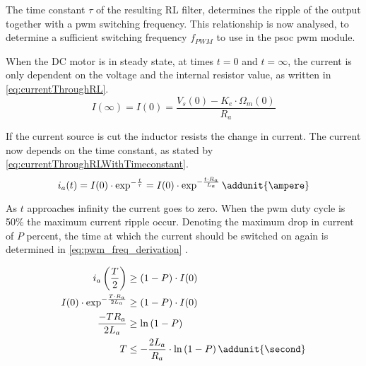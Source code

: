 The time constant $\tau$ of the resulting RL filter, determines the ripple of the output together with a \gls{pwm} switching frequency. This relationship is now analysed, to determine a sufficient switching frequency $f_{PWM}$ to use in the \gls{psoc} \gls{pwm} module.

When the DC motor is in steady state, at times $t = 0$ and $t = \infty$, the current is only dependent on the voltage and the internal resistor value, as written in \autoref{eq:currentThroughRL}. 
\begin{equation} \label{eq:currentThroughRL}
I(\infty) = I(0) = \frac{V_s(0) - K_e \cdot \Omega_m(0)}{R_a}
\end{equation}

If the current source is cut the inductor resists the change in current. The current now depends on the time constant, as stated by \autoref{eq:currentThroughRLWithTimeconstant}. 
\begin{equation}\label{eq:currentThroughRLWithTimeconstant}
	i_a (t) = I(0) \cdot \exp^{-\frac{t}{\tau}}  = I(0) \cdot \exp^{-\frac{t \cdot R_a}{L_a}} \addunit{\ampere}
\end{equation}

As $t$ approaches infinity the current goes to zero. When the \gls{pwm} duty cycle is 50\% the maximum current ripple occur. Denoting the maximum drop in current of $P$ percent, the time at which the current should be switched on again is determined in \autoref{eq:pwm_freq_derivation} \citep{web:PWMfreq}.

\begin{align} 
\nonumber	i_a\left(\frac{T}{2}\right) &\geq \left(1 - P\right) \cdot  I(0) \\ \nonumber
	I(0)\cdot \exp^{-\frac{T \cdot R_a}{2 L_a}} &\geq \left(1 - P\right) \cdot I(0) \\ \nonumber
	\frac{-T R_a}{2 L_a} &\geq \ln \left(1 - P\right)  \\ 
	T &\leq -\frac{2 L_a}{R_a} \cdot \ln \left(1 - P\right) \addunit{\second} \label{eq:pwm_freq_derivation}
\end{align}
\startexplain
{}
\stopexplain

